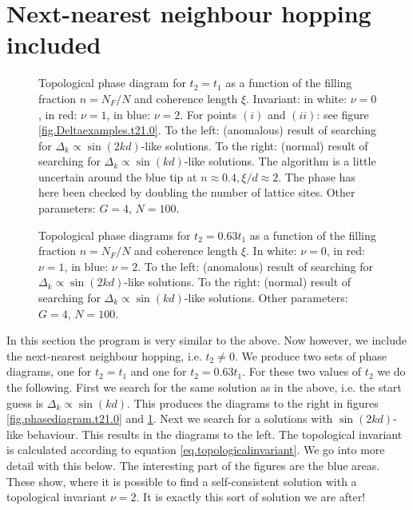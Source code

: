 \section{Next-nearest neighbour hopping included}
\label{sec.NNNincluded} 

\begin{figure}
\begin{center}

\caption{Topological phase diagram for $t_2 = t_1$ as a function of the filling fraction $n = N_F/N$ and coherence length $\xi$. Invariant: in white: $\nu = 0$, in red: $\nu = 1$, in blue: $\nu = 2$. For points $(i)$ and $(ii)$: see figure \ref{fig.Deltaexamples.t21.0}. To the left: (anomalous) result of searching for $\Delta_k\propto \sin(2kd)$-like solutions. To the right: (normal) result of searching for $\Delta_k \propto \sin(kd)$-like solutions. The algorithm is a little uncertain around the blue tip at $n \approx 0.4, \xi / d \approx 2$. The phase has here been checked by doubling the number of lattice sites. Other parameters: $G = 4$, $N = 100$. }
\label{fig.phasediagram.t21.0}
\vspace{0.5cm}

\caption{Topological phase diagrams for $t_2 = 0.63t_1$ as a function of the filling fraction $n = N_F/N$ and coherence length $\xi$. In white: $\nu = 0$, in red: $\nu = 1$, in blue: $\nu = 2$. To the left: (anomalous) result of searching for $\Delta_k\propto \sin(2kd)$-like solutions. To the right: (normal) result of searching for $\Delta_k \propto \sin(kd)$-like solutions. Other parameters: $G = 4$, $N = 100$. }
\label{fig.phasediagram.t20.63}
\end{center}
\end{figure}

In this section the program is very similar to the above. Now however, we include the next-nearest neighbour hopping, i.e. $t_2 \neq 0$. We produce two sets of phase diagrams, one for $t_2 = t_1$ and one for $t_2 = 0.63t_1$. For these two values of $t_2$ we do the following. First we search for the same solution as in the above, i.e. the start guess is $\Delta_k \propto \sin(kd)$. This produces the diagrams to the right in figures \ref{fig.phasediagram.t21.0} and \ref{fig.phasediagram.t20.63}. Next we search for a solutions with $\sin(2kd)$-like behaviour. This results in the diagrams to the left. The topological invariant is calculated according to equation \eqref{eq.topologicalinvariant}. We go into more detail with this below. The interesting part of the figures are the blue areas. These show, where it is possible to find a self-consistent solution with a topological invariant $\nu = 2$. It is exactly this sort of solution we are after!  

